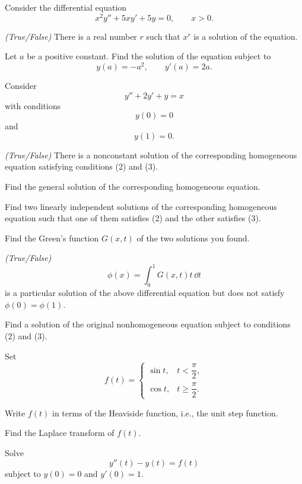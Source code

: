\begin{problem}
Consider the differential equation
\[
x^2y''+5xy'+5y=0,
\qquad x>0.
\]
\begin{problemsubparts}
\item \textit{(True/False)} There is a real number $r$ such that $x^r$ is a solution of the equation.
\item Let $a$ be a positive constant. Find the solution of the equation subject to
\[
y(a)=-a^2,
\qquad
y'(a)=2a.
\]
\end{problemsubparts}
\end{problem}

\begin{problem}
Consider
\[
y''+2y'+y=x
\]
with conditions
\[
y(0)=0 \tag{2}
\]
and
\[
y(1)=0. \tag{3}
\]
\begin{problemsubparts}
\item \textit{(True/False)} There is a nonconstant solution of the corresponding homogeneous equation satisfying conditions (2) and (3).
\item Find the general solution of the corresponding homogeneous equation.
\item Find two linearly independent solutions of the corresponding homogeneous equation such that one of them satisfies (2) and the other satisfies (3).
\item Find the Green's function $G(x,t)$ of the two solutions you found.
\item \textit{(True/False)}
\[
\phi(x)=\int_0^1G(x,t)t\,\dd t
\]
is a particular solution of the above differential equation but does not satisfy $\phi(0)=\phi(1)$.
\item Find a solution of the original nonhomogeneous equation subject to conditions (2) and (3).
\end{problemsubparts}
\end{problem}

\begin{problem}
Set
\[
f(t)=
\begin{cases}
\sin t, & t<\dfrac{\pi}{2},\\[0.4em]
\cos t, & t\ge\dfrac{\pi}{2}.
\end{cases}
\]
\begin{problemsubparts}
\item Write $f(t)$ in terms of the Heaviside function, i.e., the unit step function.
\item Find the Laplace transform of $f(t)$.
\item Solve
\[
y''(t)-y(t)=f(t)
\]
subject to $y(0)=0$ and $y'(0)=1$.
\end{problemsubparts}
\end{problem}

